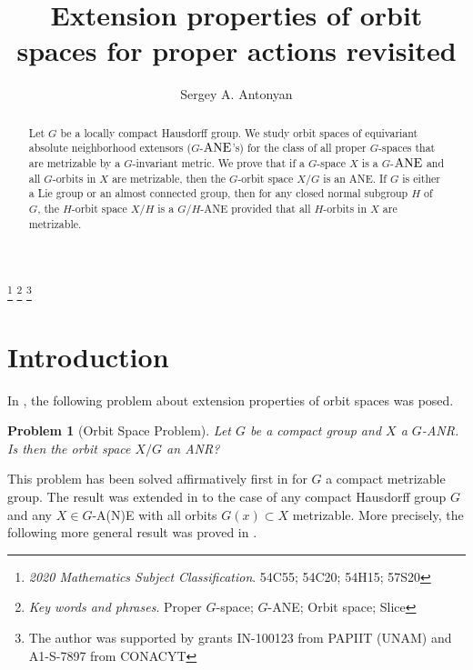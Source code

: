 \documentclass{amsart}
\newtheorem{problem}[theorem]{Problem}
\begin{document}
\title{Extension properties of orbit spaces for proper  actions  revisited}

\author{Sergey A. Antonyan\\[3pt]}

\address{Departamento de  Matem\'aticas,
Facultad de Ciencias, Universidad Nacional Aut\'onoma de M\'exico,
 04510 M\'exico City, M\'exico.}


\begin{abstract} Let  $G$ be a locally compact Hausdorff group. We   study orbit spaces   of equivariant absolute neighborhood extensors ($G$-${\rm ANE}$'s) for the class
 of all proper $G$-spaces  that are metrizable by a $G$-invariant metric. 
 We  prove that if a  $G$-space $X$ is a  $G$-${\rm ANE}$ and all  $G $-orbits in $X$ are metrizable, then  the $G$-orbit space  $X/G$ is an {\rm ANE}. If $G$ is either a Lie group or an almost connected  group, then  for any  closed  normal subgroup $H$ of $G$,   the $H$-orbit space  $X/H$ is a $G/H$-{\rm ANE} provided that all $H$-orbits in $X$ are metrizable.
\end{abstract}

\thanks {{\it 2020 Mathematics Subject Classification}.  54C55; 54C20; 54H15; 57S20}
\thanks{{\it  Key words and phrases}. Proper $G$-space; $G$-{\rm ANE};  Orbit space; Slice} 
\thanks{The author was supported  by grants  IN-100123 from PAPIIT (UNAM) and  A1-S-7897 from CONACYT}



\maketitle
{}

\section {Introduction}\label{intro}

In  \cite[Question 4]{ant:aspects}, 
the following problem about extension properties of orbit spaces  was  posed.

\begin{problem} [Orbit Space Problem]\label{P:0} Let $G$ be a compact group and $X$ a $G$-{\rm ANR}. Is then the orbit space $X/G$ an  {\rm ANR}?
\end{problem}

This problem  has been  solved affirmatively 
first in \cite[Theorem 8]{ant:88} for $G$ a compact metrizable group.
   The result was extended  in    \cite[Theorem 1.1]{ant:99}  to the case of any
 compact Hausdorff group $G$ and any $X\in G$-A(N)E with all orbits $G(x)\subset X$ metrizable. More precisely,  the following more general result was proved in \cite[Theorem 1.1]{ant:99}. 
  
\end{document}
